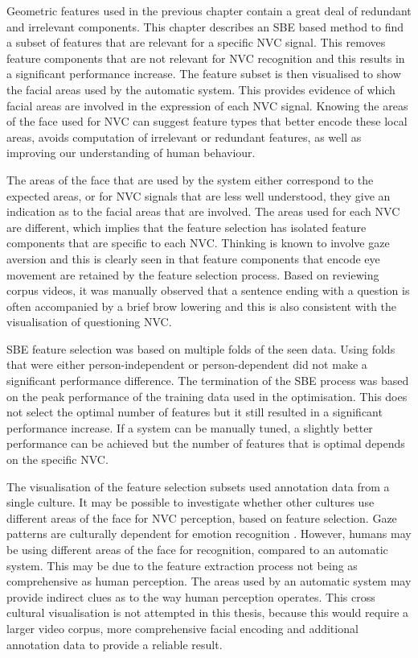 Geometric features used in the previous chapter contain a great deal of redundant and irrelevant components. This chapter describes an \ac{SBE} based method to find a subset of features that are relevant for a specific \ac{NVC} signal. This removes feature components that are not relevant for \ac{NVC} recognition and this results in a significant performance increase. The feature subset is then visualised to show the facial areas used by the automatic system. This provides evidence of which facial areas are involved in the expression of each \ac{NVC} signal. Knowing the areas of the face used for \ac{NVC} can suggest feature types that better encode these local areas, avoids computation of irrelevant or redundant features, as well as improving our understanding of human behaviour.

The areas of the face that are used by the system either correspond to the expected areas, or for \ac{NVC} signals that are less well understood, they give an indication as to the facial areas that are involved. The areas used for each \ac{NVC} are different, which implies that the feature selection has isolated feature components that are specific to each \ac{NVC}. Thinking is known to involve gaze aversion and this is clearly seen in that feature components that encode eye movement are retained by the feature selection process. Based on reviewing corpus videos, it was manually observed that a sentence ending with a question is often accompanied by a brief brow lowering and this is also consistent with the visualisation of questioning \ac{NVC}.

\ac{SBE} feature selection was based on multiple folds of the seen data. Using folds that were either person-independent or person-dependent did not make a significant performance difference. The termination of the \ac{SBE} process was based on the peak performance of the training data used in the optimisation. This does not select the optimal number of features but it still resulted in a significant performance increase. If a system can be manually tuned, a slightly better performance can be achieved but the number of features that is optimal depends on the specific \ac{NVC}.

The visualisation of the feature selection subsets used annotation data from a single culture. It may be possible to investigate whether other cultures use different areas of the face for \ac{NVC} perception, based on feature selection. Gaze patterns are culturally dependent for emotion recognition \cite{Jack2009}. However, humans may be using different areas of the face for recognition, compared to an automatic system. This may be due to the feature extraction process not being as comprehensive as human perception. The areas used by an automatic system may provide indirect clues as to the way human perception operates. This cross cultural visualisation is not attempted in this thesis, because this would require a larger video corpus, more comprehensive facial encoding and additional annotation data to provide a reliable result.

